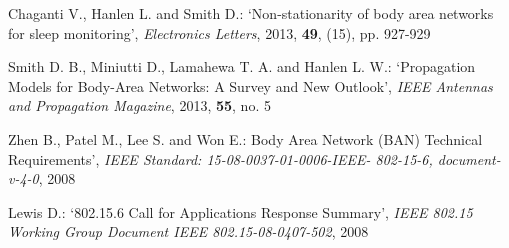 \documentclass[twocolumn]{el-author}
\begin{document}
\begin{thebibliography}{}
Chaganti V., Hanlen L. and Smith D.: `Non-stationarity of body area networks for sleep monitoring', \textit{Electronics Letters}, 2013, \textbf{49}, (15), pp. 927-929

Smith D. B., Miniutti D., Lamahewa T. A. and Hanlen L. W.: `Propagation Models for Body-Area Networks: A Survey and New Outlook', \textit{IEEE Antennas and Propagation Magazine}, 2013, \textbf{55}, no. 5

Zhen B., Patel M., Lee S. and Won E.: Body Area Network (BAN) Technical Requirements', \textit{IEEE Standard: 15-08-0037-01-0006-IEEE- 802-15-6, document-v-4-0}, 2008

Lewis D.: `802.15.6 Call for Applications Response Summary', \textit{IEEE 802.15 Working Group Document IEEE 802.15-08-0407-502}, 2008

\end{thebibliography}
\end{document}
